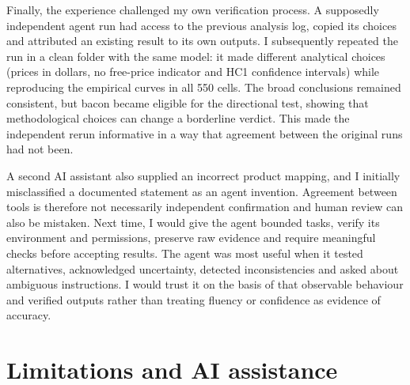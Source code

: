 \documentclass[11pt,a4paper]{article}
\begin{document}
Finally, the experience challenged my own verification process. A supposedly independent agent run had access to the previous analysis log, copied its choices and attributed an existing result to its own outputs. I subsequently repeated the run in a clean folder with the same model: it made different analytical choices (prices in dollars, no free-price indicator and HC1 confidence intervals) while reproducing the empirical curves in all 550 cells. The broad conclusions remained consistent, but bacon became eligible for the directional test, showing that methodological choices can change a borderline verdict. This made the independent rerun informative in a way that agreement between the original runs had not been.

A second AI assistant also supplied an incorrect product mapping, and I initially misclassified a documented statement as an agent invention. Agreement between tools is therefore not necessarily independent confirmation and human review can also be mistaken. Next time, I would give the agent bounded tasks, verify its environment and permissions, preserve raw evidence and require meaningful checks before accepting results. The agent was most useful when it tested alternatives, acknowledged uncertainty, detected inconsistencies and asked about ambiguous instructions. I would trust it on the basis of that observable behaviour and verified outputs rather than treating fluency or confidence as evidence of accuracy.

\section{Limitations and AI assistance}
\end{document}
